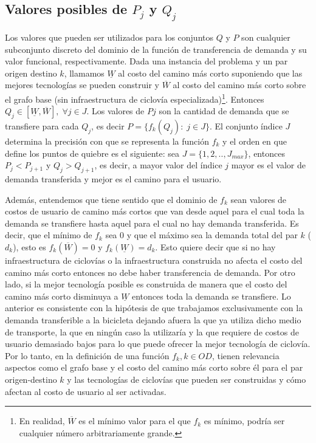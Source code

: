 \subsection{Valores posibles de $P_j$ y $Q_j$}

Los valores que pueden ser utilizados para los conjuntos $Q$ y $P$ son cualquier subconjunto discreto del dominio de la función de transferencia de demanda y su valor funcional, respectivamente. Dada una instancia del problema y un par origen destino $k$, llamamos $\underline{W}$ al costo del camino más corto suponiendo que las mejores tecnologías se pueden construir y $\overline{W}$ al costo del camino más corto sobre el grafo base (sin infraestructura de ciclovía especializada)\footnote{En realidad, $\overline{W}$ es el mínimo valor para el que $f_k$ es mínimo, podría ser cualquier número arbitrariamente grande.}. Entonces $Q_j \in [\underline{W}, \overline{W}],\; \forall j \in J$. Los valores de $Pj$ son la cantidad de demanda que se transfiere para cada $Q_j$, es decir $P = \{f_k(Q_j):\; j \in J\}$. El conjunto índice $J$ determina la precisión con que se representa la función $f_k$ y el orden en que define los puntos de quiebre es el siguiente: sea $J = \{1, 2, .. , J_{max}\}$, entonces $P_j < P_{j+1}$ y $Q_j > Q_{j+1}$, es decir, a mayor valor del índice $j$ mayor es el valor de demanda transferida y mejor es el camino para el usuario.

Además, entendemos que tiene sentido que el dominio de $f_k$ sean valores de costos de usuario de camino más cortos que van desde aquel para el cual toda la demanda se transfiere hasta aquel para el cual no hay demanda transferida. Es decir, que el mínimo de $f_k$ sea 0 y que el máximo sea la demanda total del par $k$ ($d_k$), esto es $f_k(\overline{W}) = 0$ y $f_k(\underline{W}) = d_k$. Esto quiere decir que si no hay infraestructura de ciclovías o la infraestructura construida no afecta el costo del camino más corto entonces no debe haber transferencia de demanda. Por otro lado, si la mejor tecnología posible es construida de manera que el costo del camino más corto disminuya a $\underline{W}$ entonces toda la demanda se transfiere. Lo anterior es consistente con la hipótesis de que trabajamos exclusivamente con la demanda transferible a la bicicleta dejando afuera la que ya utiliza dicho medio de transporte, la que en ningún caso la utilizaría y la que requiere de costos de usuario demasiado bajos para lo que puede ofrecer la mejor tecnología de ciclovía. Por lo tanto, en la definición de una función $f_k, k \in OD$, tienen relevancia aspectos como el grafo base y el costo del camino más corto sobre él para el par origen-destino $k$ y las tecnologías de ciclovías que pueden ser construidas y cómo afectan al costo de usuario al ser activadas.

